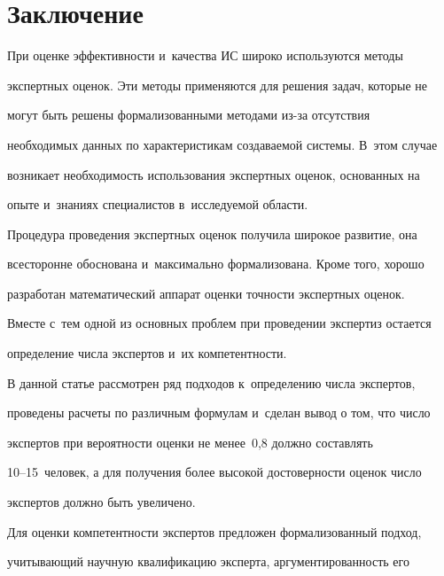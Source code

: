 \vspace*{-4pt}



\section{Заключение}



\vspace*{-1pt}



  

  При оценке эффективности и~качества ИС широко используются методы 

экспертных оценок. Эти методы применяются для решения задач, которые не 

могут быть решены формализованными методами из-за отсутствия 

необходимых данных по характеристикам создаваемой системы. В~этом случае 

возникает необходимость использования экспертных оценок, основанных на 

опыте и~знаниях специалистов в~исследуемой об\-ласти.

  

  Процедура проведения экспертных оценок получила широкое развитие, она 

всесторонне обоснована и~максимально формализована. Кроме того, хорошо 

разработан математический аппарат оценки точности экспертных оценок. 

Вместе с~тем одной из основных проблем при проведении экспертиз остается 

определение числа экспертов и~их компетентности. 

  

  

  В данной статье рассмотрен ряд подходов к~определению числа экспертов, 

проведены расчеты по различным формулам и~сделан вывод о том, что число 

экспертов при вероятности оценки не менее~0,8 должно составлять  

10--15~человек, а для получения более высокой достоверности оценок число 

экспертов должно быть увеличено.

  

  Для оценки компетентности экспертов предложен формализованный подход, 

учитывающий научную квалификацию эксперта, аргументированность его 

